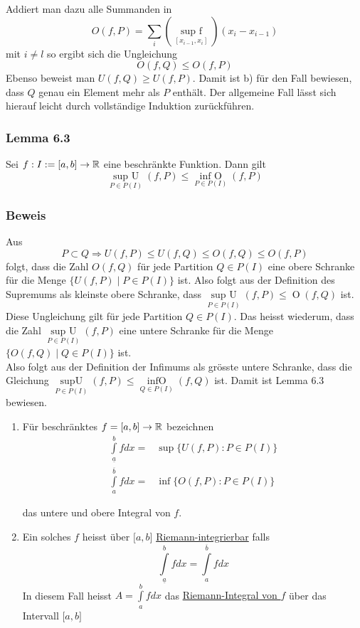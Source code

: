 Addiert man dazu alle Summanden in \[O(f,P)=\sum\limits_i {(\mathop {\sup {\text{ }}f}\limits_{[{x_{i - 1}},{x_i}]} )({x_i} - {x_{i - 1}})} \]
mit $i\neq l$ so ergibt sich die Ungleichung \[O(f,Q)\leq O(f,P)\]
Ebenso beweist man $U(f,Q)\geq U(f,P)$. Damit ist b) für den Fall bewiesen, dass $Q$ genau ein Element mehr als $P$ enthält. Der allgemeine Fall lässt sich hierauf leicht durch vollständige Induktion zurückführen.

\subsubsection*{Lemma 6.3} Sei $f:I:=\lbrack a,b \rbrack \to \mathbb{R}$ eine beschränkte Funktion. Dann gilt \[\mathop {\sup {\text{ }}U}\limits_{P \in P(I)} (f,P) \le \mathop {\inf {\text{ }}O}\limits_{P \in P(I)} (f,P)\]

\subsubsection*{Beweis}
Aus \[P\subset Q \Rightarrow U(f,P) \leq U(f,Q) \leq O(f,Q) \leq O(f,P)\] folgt, dass die Zahl $O(f,Q)$ für jede Partition $Q\in P(I)$ eine obere Schranke für die Menge $\{ U(f,P)\mid P\in P(I)\}$ ist. Also folgt aus der Definition des Supremums als kleinste obere Schranke, dass $\mathop {\sup {\text{ }}U}\limits_{P \in P(I)} (f,P) \le \mathop O(f,Q)$ ist. \\
\newpage
Diese Ungleichung gilt für jede Partition $Q\in P(I)$. Das heisst wiederum, dass die Zahl $\mathop {\sup {\text{ }}U}\limits_{P \in P(I)} (f,P)$ eine untere Schranke für die Menge $\{ O(f,Q)\mid Q \in P(I)\} $ ist.\\

Also folgt aus der Definition der Infimums als grösste untere Schranke, dass die Gleichung $\mathop {\sup U}\limits_{P \in P(I)} (f,P) \le \mathop {\inf O}\limits_{Q \in P(I)} (f,Q)$ ist. Damit ist Lemma 6.3 bewiesen.
\begin{definition}{6.4}
\begin{enumerate}[\indent 1)]

\item Für beschränktes $f=\lbrack a,b \rbrack\rightarrow \mathbb{R}$ bezeichnen
\begin{align*}
\int\limits_{\underline{a}}^b fdx =&\sup \{ U(f,P):P \in P(I)\}\\
\int\limits_{a}^{\overline{b}} fdx =&\inf \{ O(f,P):P \in P(I)\}
\end{align*}

das untere und obere Integral von $f$.
\item Ein solches $f$ heisst über $\lbrack a,b\rbrack$ \underline{Riemann-integrierbar} falls \[\int\limits_{\underline{a}}^b {fdx}  = \int\limits_a^{\overline{b}} {fdx} \] In diesem Fall heisst $A = \int\limits_a^b {fdx} $ das \underline{Riemann-Integral von $f$} über das Intervall $\lbrack a,b\rbrack$
\end{enumerate}
\end{definition}

